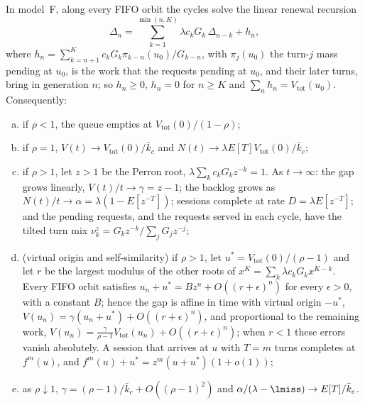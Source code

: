 \begin{theorem}\label{thm:trap}
In model~F, along every FIFO orbit the cycles solve the linear renewal recursion
\begin{equation}\label{eq:renewal}
\Delta_n=\sum_{k=1}^{\min(n,K)}\lambda c_kG_k\,\Delta_{n-k}+h_n ,
\end{equation}
where $h_n=\sum_{k=n+1}^{K}c_kG_k\pi_{k-n}(u_0)/G_{k-n}$, with $\pi_j(u_0)$ the turn-$j$ mass pending at $u_0$, is the work
that the requests pending at $u_0$, and their later turns, bring in generation $n$; so $h_n\ge0$, $h_n=0$ for $n\ge K$ and
$\sum_nh_n=V_{\mathrm{tot}}(u_0)$. Consequently:
\begin{enumerate}[(a),leftmargin=*,nosep]
\item if $\rho<1$, the queue empties at $V_{\mathrm{tot}}(0)/(1-\rho)$;
\item if $\rho=1$, $V(t)\to V_{\mathrm{tot}}(0)/\bar k_c$ and $N(t)\to\lambda E[T]V_{\mathrm{tot}}(0)/\bar k_c$;
\item if $\rho>1$, let $z>1$ be the Perron root, $\lambda\sum_kc_kG_kz^{-k}=1$. As $t\to\infty$: the gap grows linearly,
$V(t)/t\to\gamma=z-1$; the backlog grows as $N(t)/t\to\alpha=\lambda(1-E[z^{-T}])$; sessions complete at rate
$D=\lambda E[z^{-T}]$; and the pending requests, and the requests served in each cycle, have the tilted turn mix
$\nu^z_k=G_kz^{-k}/\sum_jG_jz^{-j}$;
\item (virtual origin and self-similarity) if $\rho>1$, let $u^*=V_{\mathrm{tot}}(0)/(\rho-1)$ and let $r$ be the largest modulus of
the other roots of $x^K=\sum_k\lambda c_kG_kx^{K-k}$. Every FIFO orbit satisfies $u_n+u^*=Bz^n+O((r+\epsilon)^n)$ for every
$\epsilon>0$, with a constant $B$; hence the gap is affine in time with virtual origin $-u^*$,
$V(u_n)=\gamma(u_n+u^*)+O((r+\epsilon)^n)$, and proportional to the remaining work,
$V(u_n)=\frac{\gamma}{\rho-1}V_{\mathrm{tot}}(u_n)+O((r+\epsilon)^n)$; when $r<1$ these errors vanish absolutely. A session that
arrives at $u$ with $T=m$ turns completes at $f^m(u)$, and $f^m(u)+u^*=z^m(u+u^*)(1+o(1))$;
\item as $\rho\downarrow1$, $\gamma=(\rho-1)/\bar k_c+O((\rho-1)^2)$ and $\alpha/(\lambda-\lmiss)\to E[T]/\bar k_c$.
\end{enumerate}
\end{theorem}


